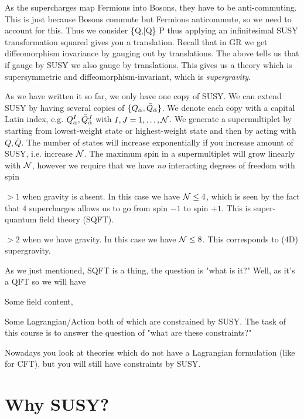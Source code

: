     \een
    \item As the supercharges map Fermions into Bosons, they have to be anti-commuting. This is just because Bosons commute but Fermions anticommute, so we need to account for this. Thus we consider
    \be 
    \label{eqn:QQbarAnticommutator}
        \{Q,\bar{Q}\} \propto P 
    \ee 
    thus applying an infinitesimal SUSY transformation squared gives you a translation. Recall that in GR we get diffeomorphism invariance by gauging out by translations. The above tells us that if gauge by SUSY we also gauge by translations. This gives us a theory which is supersymmetric and diffeomorphism-invariant, which is \emph{supergravity}.
    \item As we have written it so far, we only have one copy of SUSY. We can  extend SUSY by having several copies of $\{Q_{\alpha}, \bar{Q}_{\dot{\alpha}}\}$. We denote each copy with a capital Latin index, e.g. $Q^I_{\alpha},\bar{Q}^J_{\dot{\alpha}}$ with $I,J=1,\dots,\mathcal{N}$. We generate a supermultiplet by starting from lowest-weight state or highest-weight state and then by acting with $Q,\bar{Q}$. The number of states will increase exponentially if you increase amount of SUSY, i.e. increase $\mathcal{N}$. The maximum spin in a supermultiplet will grow linearly with $\mathcal{N}$, however we require that we have \textit{no} interacting degrees of freedom with spin 
    \ben 
        \item $>1$ when gravity is absent. In this case we have $\mathcal{N} \leq 4$, which is seen by the fact that $4$ supercharges allows us to go from spin $-1$ to spin $+1$. This is super-quantum field theory (SQFT).
        \item $>2$ when we have gravity. In this case we have $\mathcal{N} \leq 8$. This corresponds to (4D) supergravity. 
    \een 
\een

As we just mentioned, SQFT is a thing, the question is "what is it?" Well, as it's a QFT so we will have 
\ben[label=(\roman*)]
    \item Some field content,
    \item Some Lagrangian/Action
\een
both of which are constrained by SUSY. The task of this course is to answer the question of "what are these constraints?" 

\br 
    Nowadays you look at theories which do not have a Lagrangian formulation (like for CFT), but you will still have constraints by SUSY.
\er 

\section{Why SUSY?}

